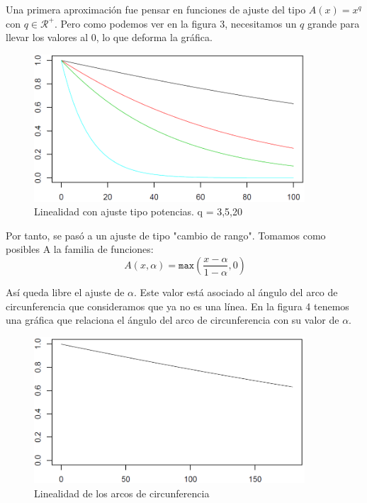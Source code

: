 Una primera aproximación fue pensar en funciones de ajuste del tipo $A(x) = x^q$ con $q \in \mathcal{R}^+$. Pero como podemos ver en la figura 3, necesitamos un $q$ grande para llevar los valores al 0, lo que deforma la gráfica.\\

\begin{figure}[H]
\begin{center}

\includegraphics[width=0.9\textwidth]{img/Ajuste-q.png}
\end{center}

\caption{Linealidad con ajuste tipo potencias. q = 3,5,20}
\end{figure}

Por tanto, se pasó a un ajuste de tipo "cambio de rango". Tomamos como posibles A la familia de funciones:\\

\[
\ A(x,\alpha) = \texttt{max}\left(\frac{x-\alpha}{1-\alpha} ,0\right)
\]

Así queda libre el ajuste de $\alpha$. Este valor está asociado al ángulo del arco de circunferencia que consideramos que ya no es una línea. En la figura 4 tenemos una gráfica que relaciona el ángulo del arco de circunferencia con su valor de $\alpha$.\\

\begin{figure}[H]
\begin{center}

\includegraphics[width=0.9\textwidth]{img/experimento-angulo.png}
\end{center}

\caption{Linealidad de los arcos de circunferencia}
\end{figure}

